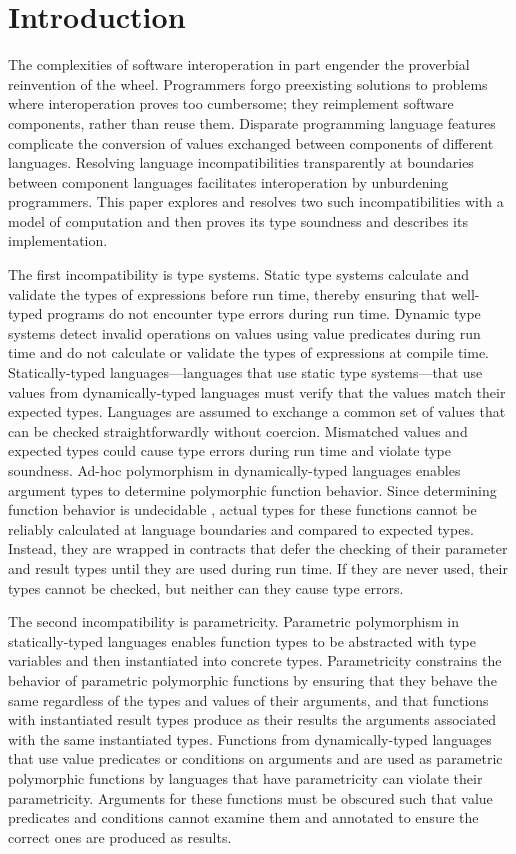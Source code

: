 \chapter{Introduction}

The complexities of software interoperation in part engender the proverbial reinvention of the wheel.  Programmers forgo preexisting solutions to problems where interoperation proves too cumbersome; they reimplement software components, rather than reuse them.  Disparate programming language features complicate the conversion of values exchanged between components of different languages.  Resolving language incompatibilities transparently at boundaries between component languages facilitates interoperation by unburdening programmers.  This paper explores and resolves two such incompatibilities with a model of computation and then proves its type soundness and describes its implementation.

The first incompatibility is type systems.  Static type systems calculate and validate the types of expressions before run time, thereby ensuring that well-typed programs do not encounter type errors during run time.  Dynamic type systems detect invalid operations on values using value predicates during run time and do not calculate or validate the types of expressions at compile time.  Statically-typed languages---languages that use static type systems---that use values from dynamically-typed languages must verify that the values match their expected types.  Languages are assumed to exchange a common set of values that can be checked straightforwardly without coercion.  Mismatched values and expected types could cause type errors during run time and violate type soundness.  Ad-hoc polymorphism in dynamically-typed languages enables argument types to determine polymorphic function behavior.  Since determining function behavior is undecidable \cite{blume04}, actual types for these functions cannot be reliably calculated at language boundaries and compared to expected types.  Instead, they are wrapped in contracts \cite{findler02} that defer the checking of their parameter and result types until they are used during run time.  If they are never used, their types cannot be checked, but neither can they cause type errors.

The second incompatibility is parametricity.  Parametric polymorphism in statically-typed languages enables function types to be abstracted with type variables and then instantiated into concrete types.  Parametricity constrains the behavior of parametric polymorphic functions by ensuring that they behave the same regardless of the types and values of their arguments, and that functions with instantiated result types produce as their results the arguments associated with the same instantiated types.  Functions from dynamically-typed languages that use value predicates or conditions on arguments and are used as parametric polymorphic functions by languages that have parametricity can violate their parametricity.  Arguments for these functions must be obscured such that value predicates and conditions cannot examine them and annotated to ensure the correct ones are produced as results.

